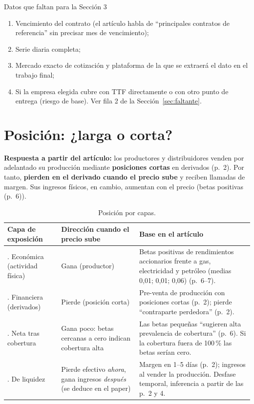 \documentclass{article} %
\newcommand{\pg}[1]{(p.~#1)}
\begin{document}
    \begin{pendiente}{Datos que faltan para la Sección 3}
    \begin{enumerate}
        \item[(i)] Vencimiento del contrato (el artículo habla de ``principales contratos de referencia'' sin precisar mes de vencimiento);
        \item[(ii)] Serie diaria completa;
        \item[(iii)] Mercado exacto de cotización y plataforma de la que se extraerá el dato en el trabajo final; 
        \item[(iv)] Si la empresa elegida cubre con TTF directamente o con otro punto de entrega (riesgo de base). Ver fila 2 de la Sección~\ref{sec:faltante}.
    \end{enumerate}
    \end{pendiente}

\section{Posición: ¿larga o corta?}

\textbf{Respuesta a partir del artículo:} los productores y distribuidores venden por adelantado su producción mediante \textbf{posiciones cortas} en derivados \pg{2}. Por tanto, \textbf{pierden en el derivado cuando el precio sube} y reciben llamadas de margen. Sus ingresos físicos, en cambio, aumentan con el precio (betas positivas \pg{6}).

\begin{table}[H]
    \centering\small
        \begin{tabularx}{\textwidth}{>{\raggedright\arraybackslash}p{3.3cm}>{\raggedright\arraybackslash}p{3.6cm}X}
            \toprule
                \textbf{Capa de exposición} & \textbf{Dirección cuando el precio sube} & \textbf{Base en el artículo} \\
            \midrule
                1. Económica (actividad física) & Gana (productor) & Betas positivas de rendimientos accionarios frente a gas, electricidad y petróleo (medias 0,01; 0,01; 0,06) \pg{6--7}. \\
                2. Financiera (derivados) & Pierde (posición corta) & Pre-venta de producción con posiciones cortas \pg{2}; pierde ``contraparte perdedora'' \pg{2}. \\
                3. Neta tras cobertura & Gana poco: betas cercanas a cero indican cobertura alta & Las betas pequeñas ``sugieren alta prevalencia de cobertura'' \pg{6}. Si la cobertura fuera de 100\,\% las betas serían cero. \\
                4. De liquidez & Pierde efectivo \emph{ahora}, gana ingresos \emph{después} (se deduce en el paper) & Margen en 1--5 días \pg{2}; ingresos al vender la producción. Desfase temporal, inferencia a partir de las p.~2 y 4. \\
            \bottomrule
        \end{tabularx}
    \caption{Posición por capas.}
\end{table}
\end{document}
